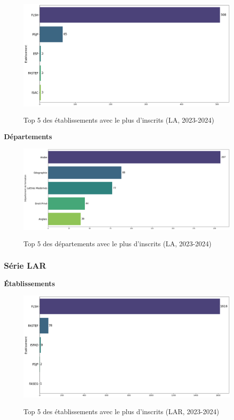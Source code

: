 \begin{figure}[ht]
\centering
\caption{Top 5 des établissements avec le plus d'inscrits (LA, 2023-2024)}
\includegraphics[width=1\textwidth]{figure/etab_LA_2024.png}
\label{fig:etab_la_2024}
\end{figure}

\textbf{Départements}

\begin{figure}[ht]
\centering
\caption{Top 5 des départements avec le plus d'inscrits (LA, 2023-2024)}
\includegraphics[width=1\textwidth]{figure/dep_LA_2024.png}
\label{fig:dep_la_2024}
\end{figure}

\newpage
\subsubsection{Série LAR}

\textbf{Établissements}

\begin{figure}[ht]
\centering
\caption{Top 5 des établissements avec le plus d'inscrits (LAR, 2023-2024)}
\includegraphics[width=1\textwidth]{figure/etab_LAR_2024.png}
\label{fig:etab_lar_2024}
\end{figure}

